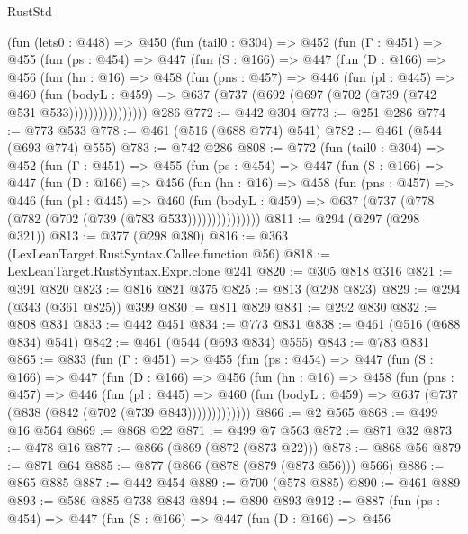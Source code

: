 \begin{lexlean}{RustStd}
\begin{coremodule}
    (fun (lets0 : @448) =>
    @450
      (fun (tail0 : @304) =>
      @452
        (fun (Γ : @451) =>
        @455
          (fun (ps : @454) =>
          @447
            (fun (S : @166) =>
            @447
              (fun (D : @166) =>
              @456
                (fun (hn : @16) =>
                @458
                  (fun (pns : @457) =>
                  @446
                    (fun (pl : @445) =>
                    @460
                      (fun (bodyL : @459) =>
                      @637 (@737 (@692 (@697 (@702 (@739 (@742 @531 @533))))))))))))))))
    @286
@772 := @442 @304
@773 := @251 @286
@774 := @773 @533
@778 := @461 (@516 (@688 @774) @541)
@782 := @461 (@544 (@693 @774) @555)
@783 := @742 @286
@808 := @772
    (fun (tail0 : @304) =>
    @452
      (fun (Γ : @451) =>
      @455
        (fun (ps : @454) =>
        @447
          (fun (S : @166) =>
          @447
            (fun (D : @166) =>
            @456
              (fun (hn : @16) =>
              @458
                (fun (pns : @457) =>
                @446
                  (fun (pl : @445) =>
                  @460
                    (fun (bodyL : @459) =>
                    @637 (@737 (@778 (@782 (@702 (@739 (@783 @533)))))))))))))))
@811 := @294 (@297 (@298 @321))
@813 := @377 (@298 @380)
@816 := @363 (LexLeanTarget.RustSyntax.Callee.function @56)
@818 := LexLeanTarget.RustSyntax.Expr.clone @241
@820 := @305 @818 @316
@821 := @391 @820
@823 := @816 @821 @375
@825 := @813 (@298 @823)
@829 := @294 (@343 (@361 @825)) @399
@830 := @811 @829
@831 := @292 @830
@832 := @808 @831
@833 := @442 @451
@834 := @773 @831
@838 := @461 (@516 (@688 @834) @541)
@842 := @461 (@544 (@693 @834) @555)
@843 := @783 @831
@865 := @833
    (fun (Γ : @451) =>
    @455
      (fun (ps : @454) =>
      @447
        (fun (S : @166) =>
        @447
          (fun (D : @166) =>
          @456
            (fun (hn : @16) =>
            @458
              (fun (pns : @457) =>
              @446
                (fun (pl : @445) =>
                @460 (fun (bodyL : @459) => @637 (@737 (@838 (@842 (@702 (@739 @843)))))))))))))
@866 := @2 @565
@868 := @499 @16 @564
@869 := @868 @22
@871 := @499 @7 @563
@872 := @871 @32
@873 := @478 @16
@877 := @866 (@869 (@872 (@873 @22)))
@878 := @868 @56
@879 := @871 @64
@885 := @877 (@866 (@878 (@879 (@873 @56))) @566)
@886 := @865 @885
@887 := @442 @454
@889 := @700 (@578 @885)
@890 := @461 @889
@893 := @586 @885 @738 @843
@894 := @890 @893
@912 := @887
    (fun (ps : @454) =>
    @447
      (fun (S : @166) =>
      @447
        (fun (D : @166) =>
        @456

\end{coremodule}
\end{lexlean}
